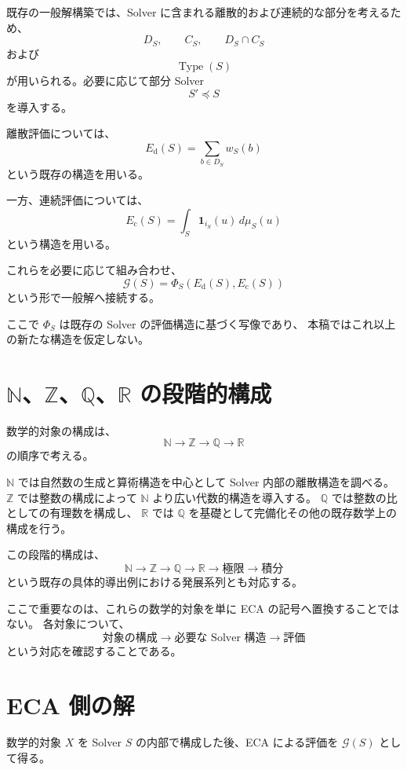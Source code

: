 \documentclass[a4paper,11pt]{article}
\begin{document}
既存の一般解構築では、Solver に含まれる離散的および連続的な部分を考えるため、
\[
D_S,\qquad C_S,\qquad D_S\cap C_S
\]
および
\[
\operatorname{Type}(S)
\]
が用いられる。必要に応じて部分 Solver
\[
S'\preceq S
\]
を導入する。

離散評価については、
\[
E_{\mathrm d}(S)
=
\sum_{b\in D_S}w_S(b)
\]
という既存の構造を用いる。

一方、連続評価については、
\[
E_{\mathrm c}(S)
=
\int_S\mathbf{1}_{i_S}(u)\,d\mu_S(u)
\]
という構造を用いる。

これらを必要に応じて組み合わせ、
\[
\boxed{
\mathcal{G}(S)
=
\Phi_S\left(
E_{\mathrm d}(S),E_{\mathrm c}(S)
\right)}
\]
という形で一般解へ接続する。

ここで $\Phi_S$ は既存の Solver の評価構造に基づく写像であり、
本稿ではこれ以上の新たな構造を仮定しない。

\section{$\mathbb{N}$、$\mathbb{Z}$、$\mathbb{Q}$、$\mathbb{R}$ の段階的構成}
\label{sec:number-systems}

数学的対象の構成は、
\[
\boxed{
\mathbb{N}
\longrightarrow
\mathbb{Z}
\longrightarrow
\mathbb{Q}
\longrightarrow
\mathbb{R}}
\]
の順序で考える。

$\mathbb{N}$ では自然数の生成と算術構造を中心として Solver 内部の離散構造を調べる。
$\mathbb{Z}$ では整数の構成によって $\mathbb{N}$ より広い代数的構造を導入する。
$\mathbb{Q}$ では整数の比としての有理数を構成し、
$\mathbb{R}$ では $\mathbb{Q}$ を基礎として完備化その他の既存数学上の構成を行う。

この段階的構成は、
\[
\mathbb{N}
\longrightarrow
\mathbb{Z}
\longrightarrow
\mathbb{Q}
\longrightarrow
\mathbb{R}
\longrightarrow
\text{極限}
\longrightarrow
\text{積分}
\]
という既存の具体的導出例における発展系列とも対応する。

ここで重要なのは、これらの数学的対象を単に ECA の記号へ置換することではない。
各対象について、
\[
\text{対象の構成}
\longrightarrow
\text{必要な Solver 構造}
\longrightarrow
\text{評価}
\]
という対応を確認することである。

\section{ECA 側の解}
\label{sec:eca-solution}

数学的対象 $X$ を Solver $S$ の内部で構成した後、ECA による評価を $\mathcal{G}(S)$ として得る。
\end{document}
